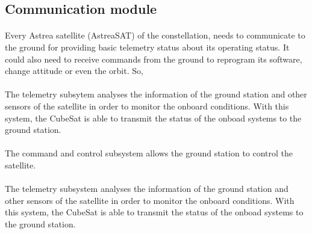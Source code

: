 \subsection{Communication module}


\paragraph{} Every Astrea satellite (AstreaSAT) of the constellation, needs to communicate to the ground for providing basic telemetry status about its operating status. It could also need to receive commands from the ground to reprogram its software, change attitude or even the orbit. So,  \\


\paragraph{} The telemetry subsytem analyses the information of the ground station and other sensors of the satellite in 	order to monitor the onboard conditions. With this system, the CubeSat is able to transmit the status of the onboad systems to the ground station.
\paragraph{}The command and control subsystem allows the ground station to control the satellite.

\paragraph{} The telemetry subsystem analyses the information of the ground station and other sensors of the satellite in order to monitor the onboard conditions. With this system, the CubeSat is able to transmit the status of the onboad systems to the ground station.